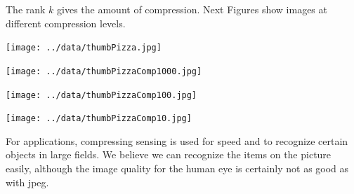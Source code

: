 \documentclass[a4paper,11pt]{amsart}
\begin{document}
The rank $k$ gives the amount of compression. Next Figures show images at different compression levels. 
\noindent\begin{minipage}[t]{0.5\linewidth}
  \vspace{2ex}
  \begin{center}
    \texttt{[image: ../data/thumbPizza.jpg]}
  \end{center}
\end{minipage}%
\begin{minipage}[t]{0.5\linewidth}
  \vspace{2ex}
  \begin{center}
    \texttt{[image: ../data/thumbPizzaComp1000.jpg]}
    \end{center}
\end{minipage}\par\bigskip

\noindent\begin{minipage}[t]{0.5\linewidth}
  \vspace{2ex}
  \begin{center}
    \texttt{[image: ../data/thumbPizzaComp100.jpg]}
  \end{center}
\end{minipage}%
\begin{minipage}[t]{0.5\linewidth}
  \vspace{2ex}
  \begin{center}
    \texttt{[image: ../data/thumbPizzaComp10.jpg]}
    \end{center}
\end{minipage}\par\bigskip


For applications, compressing sensing is used for speed and to recognize certain objects in large fields. We believe we can recognize the items on the picture easily, although the image quality for the human eye is certainly not as good as with jpeg.


\end{document}
